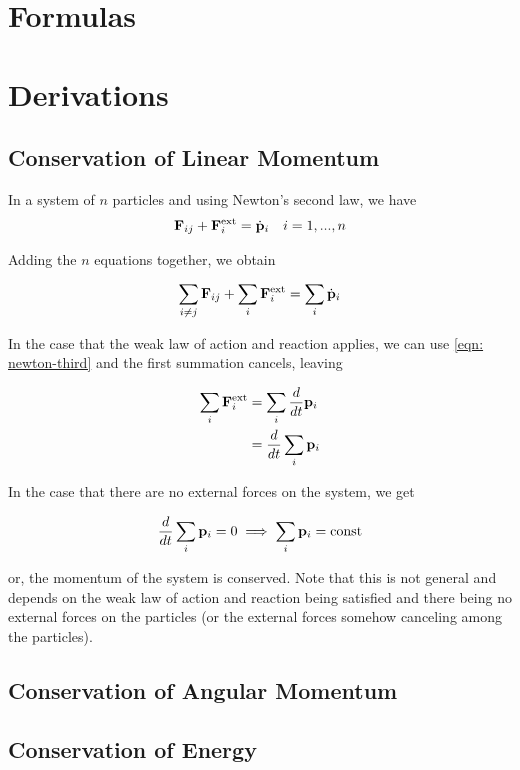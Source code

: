 \documentclass[main.tex]{subfiles}
\begin{document}
\begin{appendices}
\chapter{Formulas}

\chapter{Derivations}

\section{Conservation of Linear Momentum}
In a system of $n$ particles and using Newton's second law, we have
\begin{align*}
\vec{F}_{ij} + \vec{F}_i^{\rm{ext}} = \dot{\vec{p}}_i && i = 1, ..., n
\end{align*}

Adding the $n$ equations together, we obtain

\begin{equation*}
\sum_{i \neq j} \vec{F}_{ij} + \sum_i \vec{F}_i^{\rm{ext}} = \sum_i \dot{\vec{p}}_i
\end{equation*}

In the case that the weak law of action and reaction applies, we can use
\cref{eqn: newton-third} and the first summation cancels, leaving

\begin{align*}
\sum_i \vec{F}^{\rm{ext}}_i &= \sum_i \frac{d}{dt} \vec{p}_i \\
&= \frac{d}{dt} \sum_i \vec{p}_i
\end{align*}

In the case that there are no external forces on the system, we get

$$
\frac{d}{dt} \sum_i \vec{p}_i = 0 \implies \sum_i \vec{p}_i = \rm{const}
$$

or, the momentum of the system is conserved. Note that this is not general and depends
on the weak law of action and reaction being satisfied and there being no external forces
on the particles (or the external forces somehow canceling among the particles).

\section{Conservation of Angular Momentum}

\section{Conservation of Energy}


\end{appendices}
\end{document}
